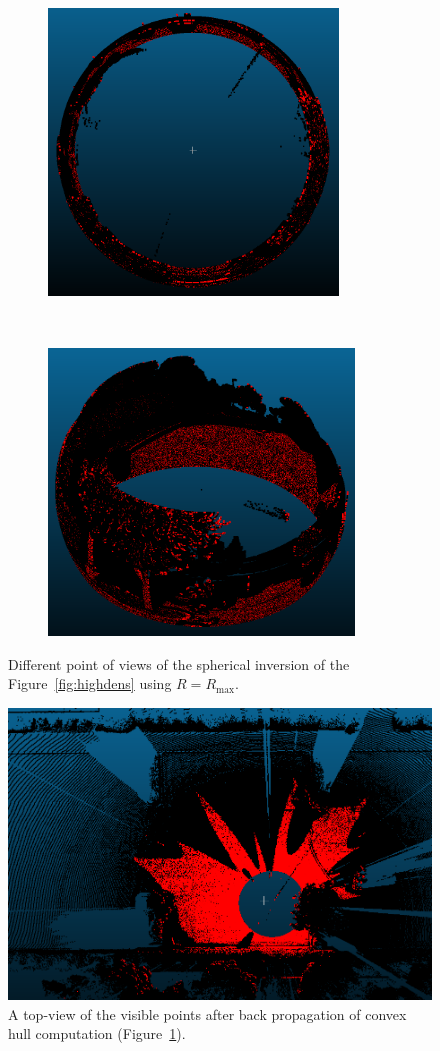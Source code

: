 \begin{figure}[t!]
  \centering
    \begin{subfigure}[t]{0.5\textwidth}
      \centering
	\includegraphics[height=3in]{img/hpr1.png}
    \end{subfigure}%
    ~
    \begin{subfigure}[t]{0.5\textwidth}
      \centering
	\includegraphics[height=3in]{img/hpr2.png}
    \end{subfigure}
    \caption{Different point of views of the spherical inversion of the Figure~\ref{fig:highdens} using $R = R_\text{max}$.}
    \label{fig:hpr1}
\end{figure}
\begin{figure}
  \centering
  \includegraphics[scale=0.6]{img/hpr4.png}
  \caption{A top-view of the visible points after back propagation of convex hull computation (Figure~\ref{fig:hpr1}).}
  \label{fig:hpr4}
\end{figure}
